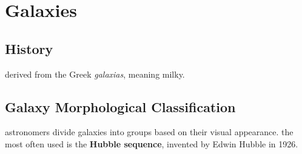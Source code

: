 \section{Galaxies}
\subsection{History}
derived from the Greek \emph{galaxias}, meaning milky.
\subsection{Galaxy Morphological Classification}
astronomers divide galaxies into groups based on their visual appearance. the most often used is the \textbf{Hubble sequence}, invented by Edwin Hubble in 1926. 

		

		

